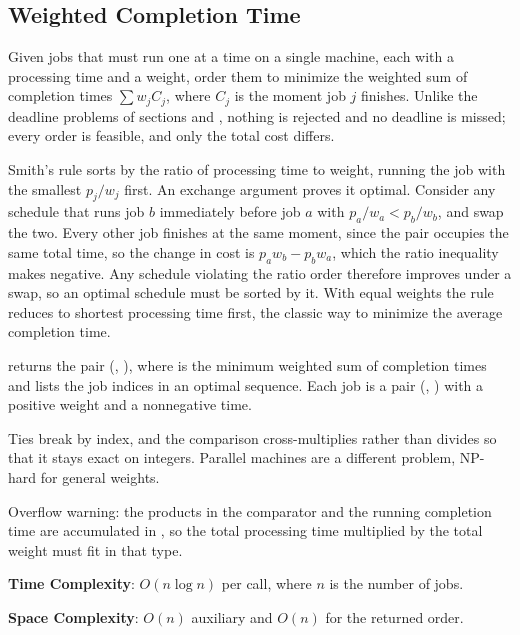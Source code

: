 \subsection{Weighted Completion Time}
\label{sec:1.5.8}
Given jobs that must run one at a time on a single machine, each with a processing time and a weight, order them to minimize the weighted sum of completion times $\sum w_j C_j$, where $C_j$ is the moment job $j$ finishes. Unlike the deadline problems of sections  and , nothing is rejected and no deadline is missed; every order is feasible, and only the total cost differs.

Smith's rule sorts by the ratio of processing time to weight, running the job with the smallest $p_j / w_j$ first. An exchange argument proves it optimal. Consider any schedule that runs job $b$ immediately before job $a$ with $p_a / w_a < p_b / w_b$, and swap the two. Every other job finishes at the same moment, since the pair occupies the same total time, so the change in cost is $p_a w_b - p_b w_a$, which the ratio inequality makes negative. Any schedule violating the ratio order therefore improves under a swap, so an optimal schedule must be sorted by it. With equal weights the rule reduces to shortest processing time first, the classic way to minimize the average completion time.

\begin{compactitem}
  \item {} returns the pair (, ), where  is the minimum weighted sum of completion times and  lists the job indices in an optimal sequence. Each job is a pair (, ) with a positive weight and a nonnegative time.
\end{compactitem}

Ties break by index, and the comparison cross-multiplies rather than divides so that it stays exact on integers. Parallel machines are a different problem, NP-hard for general weights.

Overflow warning: the products in the comparator and the running completion time are accumulated in , so the total processing time multiplied by the total weight must fit in that type.

\textbf{Time Complexity}: $O(n \log n)$ per call, where $n$ is the number of jobs.

\textbf{Space Complexity}: $O(n)$ auxiliary and $O(n)$ for the returned order.

